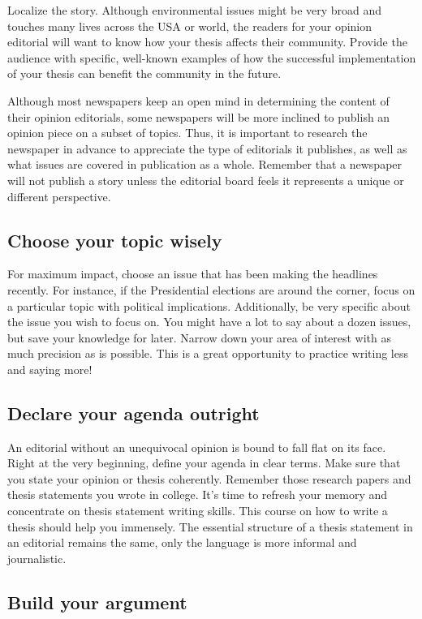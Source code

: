 \documentclass{tufte-handout}\usepackage[]{graphicx}\usepackage[]{color}
\begin{document}
Localize the story. Although environmental issues might be very broad and touches many lives across the USA or world, the readers for your opinion editorial will want to know how your thesis affects their community. Provide the audience with specific, well-known examples of how the successful implementation of your thesis can benefit the community in the future.


Although most newspapers keep an open mind in determining the content of their opinion editorials, some newspapers will be more inclined to publish an opinion piece on a subset of topics. Thus, it is important to research the newspaper in advance to appreciate the type of editorials it publishes, as well as what issues are covered in publication as a whole. Remember that a newspaper will not publish a story unless the editorial board feels it represents a unique or different perspective.

\subsection{Choose your topic wisely}

For maximum impact, choose an issue that has been making the headlines recently. For instance, if the Presidential elections are around the corner, focus on a particular topic with political implications. Additionally, be very specific about the issue you wish to focus on. You might have a lot to say about a dozen issues, but save your knowledge for later. Narrow down your area of interest with as much precision as is possible. This is a great opportunity to practice writing less and saying more!

\subsection{Declare your agenda outright}

An editorial without an unequivocal opinion is bound to fall flat on its face. Right at the very beginning, define your agenda in clear terms. Make sure that you state your opinion or thesis coherently. Remember those research papers and thesis statements you wrote in college. It's time to refresh your memory and concentrate on thesis statement writing skills. This course on how to write a thesis should help you immensely. The essential structure of a thesis statement in an editorial remains the same, only the language is more informal and journalistic.

\subsection{Build your argument}
\end{document}
